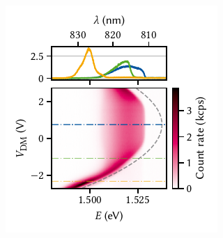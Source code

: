 \begin{marginfigure}
    \centering
    \includegraphics{img/pdf/experiment/doped_M1_05_49-2_difference_mode}
    \caption[
        \protect\newline
    ]{
        \Gls{pl} as function of difference-mode voltage on a large exciton trap.
        The observed Stark shift follows roughly the expected quadratic dispersion, but is offset by \qty{0.75}{\volt} with respect to zero bias.
        Dashed gray line is a guide to the eye of a parabola with curvature \qty{-3.5}{\milli\electronvolt\per\volt\squared}.
        Line cuts in the upper panel are taken at the voltages indicated by dash-dotted lines in the lower.
    }
    \label{fig:exp:pl:doped_M1_05_49-2_difference_mode}
\end{marginfigure}

